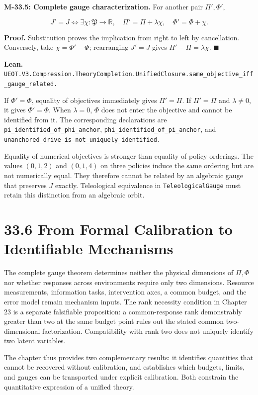 \documentclass[
  english,
  11pt,
  oneside]{book}
\begin{document}
\textbf{M-33.5: Complete gauge characterization.} For another pair \(\Pi',\Phi'\),

\[J'=J\iff\exists\chi:\mathfrak P\to\mathbb R,
\quad\Pi'=\Pi+\lambda\chi,\quad\Phi'=\Phi+\chi.\]

\textbf{Proof.} Substitution proves the implication from right to left by cancellation. Conversely, take \(\chi=\Phi'-\Phi\); rearranging \(J'=J\) gives \(\Pi'-\Pi=\lambda\chi\). \(\blacksquare\)

\textbf{Lean.} \nolinkurl{UEOT.V3.Compression.TheoryCompletion.UnifiedClosure.same_objective_iff_gauge_related.}

If \(\Phi'=\Phi\), equality of objectives immediately gives \(\Pi'=\Pi\). If \(\Pi'=\Pi\) and \(\lambda\ne0\), it gives \(\Phi'=\Phi\). When \(\lambda=0\), \(\Phi\) does not enter the objective and cannot be identified from it. The corresponding declarations are \nolinkurl{pi_identified_of_phi_anchor}, \nolinkurl{phi_identified_of_pi_anchor}, and \nolinkurl{unanchored_drive_is_not_uniquely_identified.}

Equality of numerical objectives is stronger than equality of policy orderings. The values \((0,1,2)\) and \((0,1,4)\) on three policies induce the same ordering but are not numerically equal. They therefore cannot be related by an algebraic gauge that preserves \(J\) exactly. Teleological equivalence in \nolinkurl{TeleologicalGauge} must retain this distinction from an algebraic orbit.

\section{33.6 From Formal Calibration to Identifiable Mechanisms}\label{from-formal-calibration-to-identifiable-mechanisms}

The complete gauge theorem determines neither the physical dimensions of \(\Pi,\Phi\) nor whether responses across environments require only two dimensions. Resource measurements, information tasks, intervention axes, a common budget, and the error model remain mechanism inputs. The rank necessity condition in Chapter 23 is a separate falsifiable proposition: a common-response rank demonstrably greater than two at the same budget point rules out the stated common two-dimensional factorization. Compatibility with rank two does not uniquely identify two latent variables.

The chapter thus provides two complementary results: it identifies quantities that cannot be recovered without calibration, and establishes which budgets, limits, and gauges can be transported under explicit calibration. Both constrain the quantitative expression of a unified theory.
\end{document}
